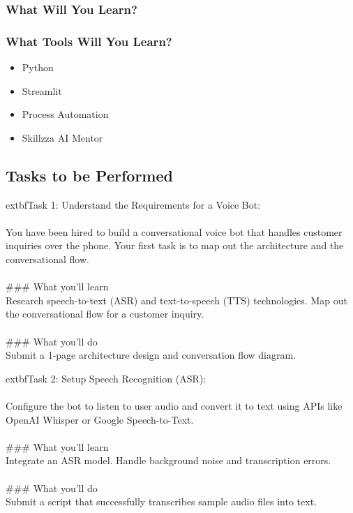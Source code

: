 \documentclass{article}
\begin{document}
\subsubsection*{What Will You Learn?}
\begin{itemize}
\end{itemize}

\subsubsection*{What Tools Will You Learn?}
\begin{itemize}
    \item Python
    \item Streamlit
    \item Process Automation
    \item Skillzza AI Mentor
\end{itemize}

\subsection*{Tasks to be Performed}
	extbf{Task 1: Understand the Requirements for a Voice Bot:}  \\
 \\
 You have been hired to build a conversational voice bot that handles customer inquiries over the phone. Your first task is to map out the architecture and the conversational flow. \\
 \\
### What you'll learn \\
Research speech-to-text (ASR) and text-to-speech (TTS) technologies. Map out the conversational flow for a customer inquiry. \\
 \\
### What you'll do \\
Submit a 1-page architecture design and conversation flow diagram.

	extbf{Task 2: Setup Speech Recognition (ASR):}  \\
 \\
 Configure the bot to listen to user audio and convert it to text using APIs like OpenAI Whisper or Google Speech-to-Text. \\
 \\
### What you'll learn \\
Integrate an ASR model. Handle background noise and transcription errors. \\
 \\
### What you'll do \\
Submit a script that successfully transcribes sample audio files into text.
\end{document}
